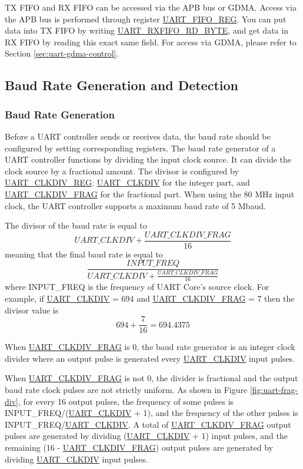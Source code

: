 \documentclass[main\_\_EN.tex]{subfiles}
\begin{document}
TX FIFO and RX FIFO can be accessed via the APB bus or GDMA. Access via the APB bus is performed through register \hyperref[regdesc:UARTFIFOREG]{UART\_FIFO\_REG}. You can put data into TX FIFO by writing \hyperref[fielddesc:UARTRXFIFORDBYTE]{UART\_RXFIFO\_RD\_BYTE}, and get data in RX FIFO by reading this exact same field. For access via GDMA, please refer to Section \ref{sec:uart-gdma-control}.

\subsection{Baud Rate Generation and Detection}

\subsubsection{Baud Rate Generation}

Before a UART controller sends or receives data, the baud rate should be configured by setting corresponding registers. The baud rate generator of a UART controller functions by dividing the input clock source. It can divide the clock source by a fractional amount. The divisor is configured by \hyperref[regdesc:UARTCLKDIVREG]{UART\_CLKDIV\_REG}: \hyperref[fielddesc:UARTCLKDIV]{UART\_CLKDIV} for the integer part, and \hyperref[fielddesc:UARTCLKDIVFRAG]{UART\_CLKDIV\_FRAG} for the fractional part. When using the 80 MHz input clock, the UART controller supports a maximum baud rate of 5 Mbaud.

The divisor of the baud rate is equal to
\[
    \hyperref[fielddesc:UARTCLKDIV]{UART\_CLKDIV} + \frac{\hyperref[fielddesc:UARTCLKDIVFRAG]{UART\_CLKDIV\_FRAG}}{16}
\]
meaning that the final baud rate is equal to
\[
    \frac{INPUT\_FREQ}{\hyperref[fielddesc:UARTCLKDIV]{UART\_CLKDIV} + \frac{\hyperref[fielddesc:UARTCLKDIVFRAG]{UART\_CLKDIV\_FRAG}}{16}}
\]
where INPUT\_FREQ is the frequency of UART Core's source clock. For example, if \hyperref[fielddesc:UARTCLKDIV]{UART\_CLKDIV} = 694 and \hyperref[fielddesc:UARTCLKDIVFRAG]{UART\_CLKDIV\_FRAG} = 7
then the divisor value is
\[
    694 + \frac{7}{16} = 694.4375
\]

When \hyperref[fielddesc:UARTCLKDIVFRAG]{UART\_CLKDIV\_FRAG} is 0, the baud rate generator is an integer clock divider where an output pulse is generated every
\hyperref[fielddesc:UARTCLKDIV]{UART\_CLKDIV} input pulses.

When \hyperref[fielddesc:UARTCLKDIVFRAG]{UART\_CLKDIV\_FRAG} is not 0, the divider is fractional and the output baud rate clock pulses are not strictly uniform.
As shown in Figure \ref{fig:uart-frag-div}, for every 16 output pulses, the frequency of some pulses is INPUT\_FREQ/(\hyperref[fielddesc:UARTCLKDIV]{UART\_CLKDIV} + 1), and the frequency of the other pulses is INPUT\_FREQ/\hyperref[fielddesc:UARTCLKDIV]{UART\_CLKDIV}. A total of \hyperref[fielddesc:UARTCLKDIVFRAG]{UART\_CLKDIV\_FRAG} output pulses are generated by dividing (\hyperref[fielddesc:UARTCLKDIV]{UART\_CLKDIV} + 1) input pulses, and the remaining
(16 - \hyperref[fielddesc:UARTCLKDIVFRAG]{UART\_CLKDIV\_FRAG}) output pulses are generated by dividing \hyperref[fielddesc:UARTCLKDIV]{UART\_CLKDIV} input pulses.
\end{document}
